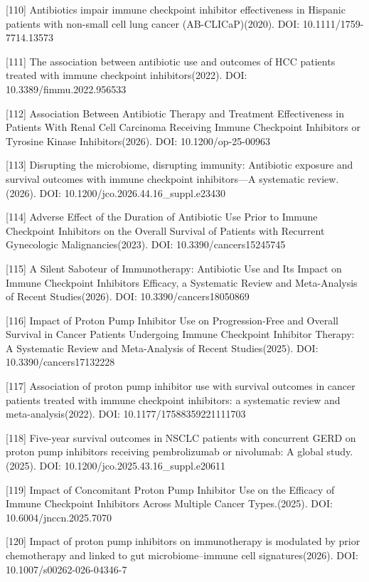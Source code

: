 {[}110{]} Antibiotics impair immune checkpoint inhibitor effectiveness in Hispanic patients with non-small cell lung cancer (AB-CLICaP)(2020). DOI: 10.1111/1759-7714.13573

{[}111{]} The association between antibiotic use and outcomes of HCC patients treated with immune checkpoint inhibitors(2022). DOI: 10.3389/fimmu.2022.956533

{[}112{]} Association Between Antibiotic Therapy and Treatment Effectiveness in Patients With Renal Cell Carcinoma Receiving Immune Checkpoint Inhibitors or Tyrosine Kinase Inhibitors(2026). DOI: 10.1200/op-25-00963

{[}113{]} Disrupting the microbiome, disrupting immunity: Antibiotic exposure and survival outcomes with immune checkpoint inhibitors---A systematic review.(2026). DOI: 10.1200/jco.2026.44.16\_suppl.e23430

{[}114{]} Adverse Effect of the Duration of Antibiotic Use Prior to Immune Checkpoint Inhibitors on the Overall Survival of Patients with Recurrent Gynecologic Malignancies(2023). DOI: 10.3390/cancers15245745

{[}115{]} A Silent Saboteur of Immunotherapy: Antibiotic Use and Its Impact on Immune Checkpoint Inhibitors Efficacy, a Systematic Review and Meta-Analysis of Recent Studies(2026). DOI: 10.3390/cancers18050869

{[}116{]} Impact of Proton Pump Inhibitor Use on Progression-Free and Overall Survival in Cancer Patients Undergoing Immune Checkpoint Inhibitor Therapy: A Systematic Review and Meta-Analysis of Recent Studies(2025). DOI: 10.3390/cancers17132228

{[}117{]} Association of proton pump inhibitor use with survival outcomes in cancer patients treated with immune checkpoint inhibitors: a systematic review and meta-analysis(2022). DOI: 10.1177/17588359221111703

{[}118{]} Five-year survival outcomes in NSCLC patients with concurrent GERD on proton pump inhibitors receiving pembrolizumab or nivolumab: A global study.(2025). DOI: 10.1200/jco.2025.43.16\_suppl.e20611

{[}119{]} Impact of Concomitant Proton Pump Inhibitor Use on the Efficacy of Immune Checkpoint Inhibitors Across Multiple Cancer Types.(2025). DOI: 10.6004/jnccn.2025.7070

{[}120{]} Impact of proton pump inhibitors on immunotherapy is modulated by prior chemotherapy and linked to gut microbiome--immune cell signatures(2026). DOI: 10.1007/s00262-026-04346-7

